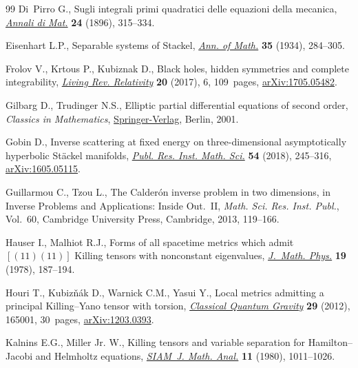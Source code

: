 \documentclass[pdftex]{sigma}
\numberwithin{equation}{section}
\begin{document}
\begin{thebibliography}{99}
Di~Pirro G., Sugli integrali primi quadratici delle equazioni della mecanica,
 \href{https://doi.org/10.1007/BF02419532}{\textit{Annali di Mat.}} \textbf{24} (1896), 315--334.

Eisenhart L.P., Separable systems of {S}tackel, \href{https://doi.org/10.2307/1968433}{\textit{Ann. of Math.}}
 \textbf{35} (1934), 284--305.

Frolov V., Krtous P., Kubiznak D., Black holes, hidden symmetries and complete
 integrability, \href{https://doi.org/10.1007/s41114-017-0009-9}{\textit{Living Rev. Relativity}} \textbf{20} (2017), 6,
 109~pages, \href{https://arxiv.org/abs/1705.05482}{arXiv:1705.05482}.

Gilbarg D., Trudinger N.S.,
Elliptic partial differential equations of second order, \textit{Classics in Mathematics},
\href{https://doi.org/10.1007/978-3-642-61798-0}{Springer-Verlag}, Berlin, 2001.

Gobin D., Inverse scattering at fixed energy on three-dimensional
 asymptotically hyperbolic {S}t\"{a}ckel manifolds, \href{https://doi.org/10.4171/PRIMS/54-2-2}{\textit{Publ. Res. Inst.
 Math. Sci.}} \textbf{54} (2018), 245--316, \href{https://arxiv.org/abs/1605.05115}{arXiv:1605.05115}.

Guillarmou C., Tzou L., The {C}alder\'{o}n inverse problem in two dimensions,
 in Inverse Problems and Applications: Inside Out.~{II}, \textit{Math. Sci.
 Res. Inst. Publ.}, Vol.~60, Cambridge University Press, Cambridge, 2013,
 119--166.

Hauser I., Malhiot R.J., Forms of all spacetime metrics which admit {$[(11)
 (11)]$} {K}illing tensors with nonconstant eigenvalues, \href{https://doi.org/10.1063/1.523523}{\textit{J.~Math.
 Phys.}} \textbf{19} (1978), 187--194.

Houri T., Kubiz\v{n}\'{a}k D., Warnick C.M., Yasui Y., Local metrics admitting
 a principal {K}illing--{Y}ano tensor with torsion, \href{https://doi.org/10.1088/0264-9381/29/16/165001}{\textit{Classical Quantum
 Gravity}} \textbf{29} (2012), 165001, 30~pages, \href{https://arxiv.org/abs/1203.0393}{arXiv:1203.0393}.

Kalnins E.G., Miller Jr. W., Killing tensors and variable separation for
 {H}amilton--{J}acobi and {H}elmholtz equations, \href{https://doi.org/10.1137/0511089}{\textit{SIAM~J. Math. Anal.}}
 \textbf{11} (1980), 1011--1026.


\end{thebibliography}
\end{document}
